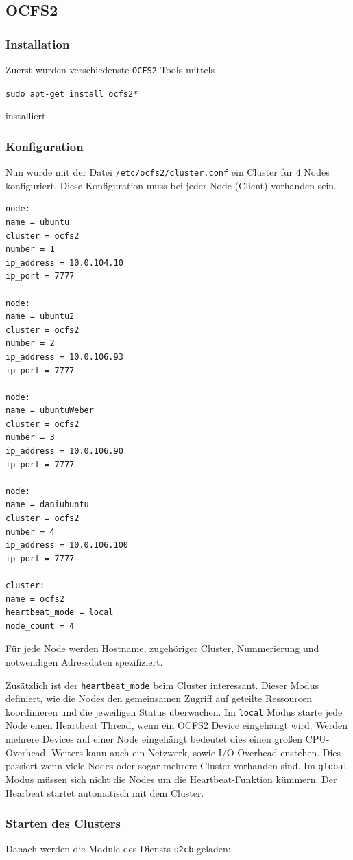 \subsection{OCFS2}
\subsubsection{Installation}
Zuerst wurden verschiedenste \texttt{OCFS2} Tools mittels

\texttt{sudo apt-get install ocfs2*}

installiert.\clearpage
\subsubsection{Konfiguration}
Nun wurde mit der Datei \texttt{/etc/ocfs2/cluster.conf} ein Cluster für 4 Nodes konfiguriert. Diese Konfiguration muss bei jeder Node (Client) vorhanden sein.
\begin{lstlisting}[style=bash, caption=\texttt{/etc/ocfs2/cluster.conf}]
node:
name = ubuntu
cluster = ocfs2
number = 1
ip_address = 10.0.104.10
ip_port = 7777

node:
name = ubuntu2
cluster = ocfs2
number = 2
ip_address = 10.0.106.93
ip_port = 7777

node:
name = ubuntuWeber
cluster = ocfs2
number = 3
ip_address = 10.0.106.90
ip_port = 7777

node:
name = daniubuntu
cluster = ocfs2
number = 4
ip_address = 10.0.106.100
ip_port = 7777

cluster:
name = ocfs2
heartbeat_mode = local
node_count = 4

\end{lstlisting}
Für jede Node werden Hostname, zugehöriger Cluster, Nummerierung und notwendigen Adressdaten spezifiziert.

Zusätzlich ist der \texttt{heartbeat\_mode} beim Cluster interessant. Dieser Modus definiert, wie die Nodes den gemeinsamen Zugriff auf geteilte Ressourcen koordinieren und die jeweiligen Status überwachen. Im \texttt{local} Modus starte jede Node einen Heartbeat Thread, wenn ein OCFS2 Device eingehängt wird. Werden mehrere Devices auf einer Node eingehängt bedeutet dies einen großen CPU-Overhead. Weiters kann auch ein Netzwerk, sowie I/O Overhead enstehen. Dies passiert wenn viele Nodes oder sogar mehrere Cluster vorhanden sind.   Im \texttt{global} Modus müssen sich nicht die Nodes um die Heartbeat-Funktion kümmern. Der Hearbeat startet automatisch mit dem Cluster. \cite{heartbeat}
\subsubsection{Starten des Clusters}
Danach werden die Module des Diensts \texttt{o2cb} geladen:

